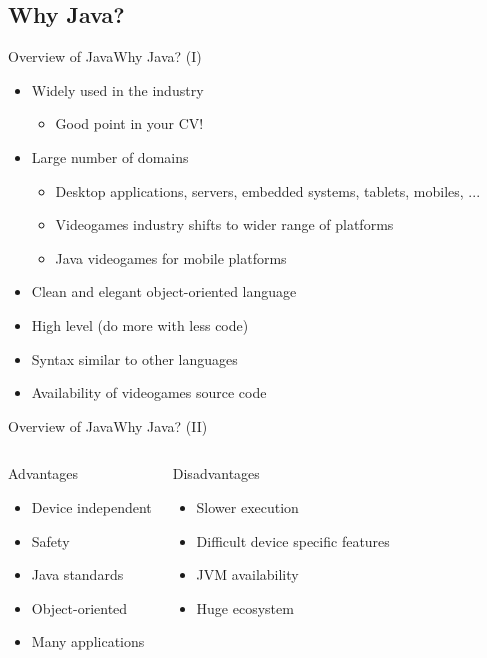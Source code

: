 \documentclass[10pt,compress]{beamer} %
\begin{document}
\subsection[Why Java?]{Why Java?}
\begin{frame}{Overview of Java}{Why Java? (I)}
	\begin{itemize}
	\item Widely used in the industry
		\begin{itemize}
		\item Good point in your CV!
		\end{itemize}
	\item Large number of domains
		\begin{itemize}
		\item Desktop applications, servers, embedded systems, tablets, mobiles, ...
		\item Videogames industry shifts to wider range of platforms
		\item Java videogames for mobile platforms
		\end{itemize}
	\item Clean and elegant object-oriented language
	\item High level (do more with less code)
	\item Syntax similar to other languages
	\item Availability of videogames source code
  	\end{itemize}
\end{frame}

\begin{frame}{Overview of Java}{Why Java? (II)}
    \begin{columns}
	   \begin{block}{Advantages}
  		\begin{itemize}
		\item Device independent
		\item Safety
		\item Java standards
		\item Object-oriented
		\item Many applications
  		\end{itemize}
		\end{block}
		\begin{block}{Disadvantages}
		\begin{itemize}
		\item Slower execution
		\item Difficult device specific features
		\item JVM availability
		\item Huge ecosystem
  		\end{itemize}
		\end{block}
	\end{columns}
\end{frame}
\end{document}

